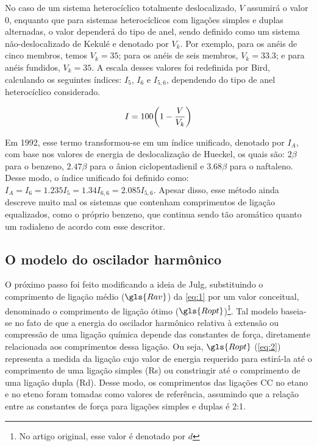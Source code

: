 No caso de um sistema heterocíclico totalmente deslocalizado, $V$ assumirá o valor 0, enquanto que para sistemas heterocíclicos com ligações simples e duplas alternadas, o valor dependerá do tipo de anel, sendo definido como um sistema não-deslocalizado de Kekulé e denotado por $V_k$. Por exemplo, para os anéis de cinco membros, temos $V_k = 35$; para os anéis de seis membros, $V_k = 33.3$; e para anéis fundidos, $V_k = 35$. A escala desses valores foi redefinida por Bird, calculando os seguintes índices: $I_5$, $I_6$ e $I_{5,6}$, dependendo do tipo de anel heterocíclico considerado.

\begin{equation}
    I = 100 \bigg{(} 1 - \frac{V}{V_k} \bigg{)}
\end{equation}

Em 1992, esse termo transformou-se em um índice unificado, denotado por $I_A$, com base nos valores de energia de deslocalização de Hueckel, os quais são: $2 \beta$ para o benzeno, $2.47 \beta$ para o ânion ciclopentadienil e $3.68 \beta$ para o naftaleno. Desse modo, o índice unificado foi definido como: $I_A = I_6 = 1.235 I_5 = 1.34 I_{6,6} = 2.085 I_{5,6}$. Apesar disso, esse método ainda descreve muito mal os sistemas que contenham comprimentos de ligação equalizados, como o próprio benzeno, que continua sendo tão aromático quanto um radialeno de acordo com esse descritor.

\subsection{O modelo do oscilador harmônico}\label{sec:HOMA}

O próximo passo foi feito modificando a ideia de Julg, substituindo o comprimento de ligação médio ($\gls{Rav}$) da \autoref{eq:1} por um valor conceitual, denominado o comprimento de ligação ótimo ($\gls{Ropt}$)\footnote{No artigo original\autocite{Kruszewski1972}, esse valor é denotado por $d$}. Tal modelo baseia-se no fato de que a energia do oscilador harmônico relativa à extensão ou compressão de uma ligação química depende das constantes de força, diretamente relacionada aos comprimentos dessa ligação. Ou seja, $\gls{Ropt}$ (\autoref{eq:2}) representa a medida da ligação cujo valor de energia requerido para estirá-la até o comprimento de uma ligação simples (\gls{Rs}) ou constringir até o comprimento de uma ligação dupla (\gls{Rd}). Desse modo, os comprimentos das ligações CC no etano e no eteno foram tomadas como valores de referência, assumindo que a relação entre as constantes de força para ligações simples e duplas é 2:1.

